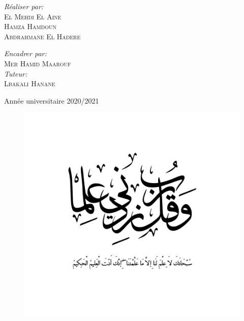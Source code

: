 \documentclass[a4paper]{report}
\begin{document}
\begin{titlepage}
\begin{center}
\begin{minipage}{0.4\textwidth}
\begin{flushleft}
\emph{Réaliser par:}\\
\textsc{El Mehdi El Aine}\\
\textsc{Hamza Hamdoun}\\
\textsc{Abdrahmane El Hadere}\\
\end{flushleft}
\end{minipage}
\begin{minipage}{0.4\textwidth}
\begin{flushright} \large
\emph{Encadrer par:} \\
\textsc{Mer Hamid Maarouf}\\
\emph{Tuteur:} \\
\textsc{Lbakali Hanane}\\
\end{flushright}
\end{minipage}
\vfill
{\large Année universitaire 2020/2021}
\end{center}
\end{titlepage}
\begin{figure}
    \centering
    \includegraphics[width=15cm]{images/rabbi zidni ilma.PNG}
\end{figure}
\newpage
\end{document}
